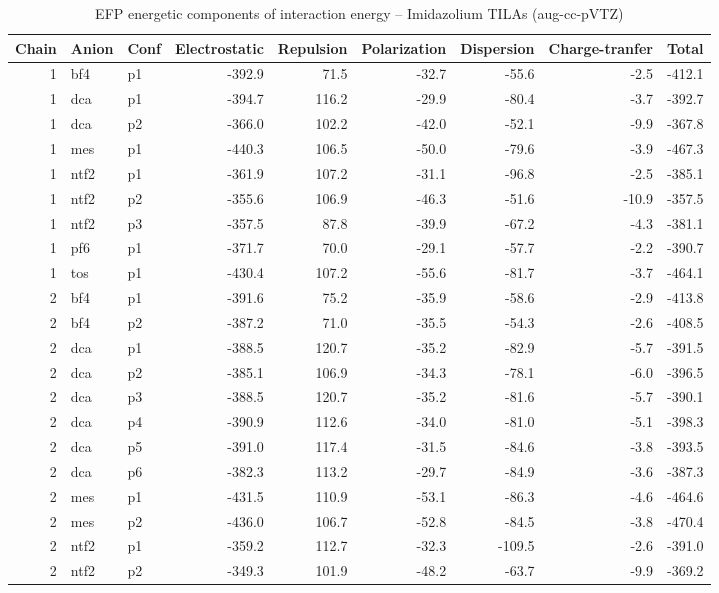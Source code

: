 \documentclass[a4paper]{article}
\begin{document}
\begin{table}[ht]
\centering
\footnotesize
\caption{EFP energetic components of interaction energy -- Imidazolium TILAs (aug-cc-pVTZ)}
\begin{tabular}{rllrrrrrr}
  \hline
Chain & Anion & Conf & Electrostatic & Repulsion & Polarization & Dispersion & Charge-tranfer & Total \\ 
  \hline
 1 & bf4 & p1 & -392.9 & 71.5 & -32.7 & -55.6 & -2.5 & -412.1 \\ 
   1 & dca & p1 & -394.7 & 116.2 & -29.9 & -80.4 & -3.7 & -392.7 \\ 
   1 & dca & p2 & -366.0 & 102.2 & -42.0 & -52.1 & -9.9 & -367.8 \\ 
   1 & mes & p1 & -440.3 & 106.5 & -50.0 & -79.6 & -3.9 & -467.3 \\ 
   1 & ntf2 & p1 & -361.9 & 107.2 & -31.1 & -96.8 & -2.5 & -385.1 \\ 
   1 & ntf2 & p2 & -355.6 & 106.9 & -46.3 & -51.6 & -10.9 & -357.5 \\ 
   1 & ntf2 & p3 & -357.5 & 87.8 & -39.9 & -67.2 & -4.3 & -381.1 \\ 
   1 & pf6 & p1 & -371.7 & 70.0 & -29.1 & -57.7 & -2.2 & -390.7 \\ 
   1 & tos & p1 & -430.4 & 107.2 & -55.6 & -81.7 & -3.7 & -464.1 \\ 
   2 & bf4 & p1 & -391.6 & 75.2 & -35.9 & -58.6 & -2.9 & -413.8 \\ 
   2 & bf4 & p2 & -387.2 & 71.0 & -35.5 & -54.3 & -2.6 & -408.5 \\ 
   2 & dca & p1 & -388.5 & 120.7 & -35.2 & -82.9 & -5.7 & -391.5 \\ 
   2 & dca & p2 & -385.1 & 106.9 & -34.3 & -78.1 & -6.0 & -396.5 \\ 
   2 & dca & p3 & -388.5 & 120.7 & -35.2 & -81.6 & -5.7 & -390.1 \\ 
   2 & dca & p4 & -390.9 & 112.6 & -34.0 & -81.0 & -5.1 & -398.3 \\ 
   2 & dca & p5 & -391.0 & 117.4 & -31.5 & -84.6 & -3.8 & -393.5 \\ 
   2 & dca & p6 & -382.3 & 113.2 & -29.7 & -84.9 & -3.6 & -387.3 \\ 
   2 & mes & p1 & -431.5 & 110.9 & -53.1 & -86.3 & -4.6 & -464.6 \\ 
   2 & mes & p2 & -436.0 & 106.7 & -52.8 & -84.5 & -3.8 & -470.4 \\ 
   2 & ntf2 & p1 & -359.2 & 112.7 & -32.3 & -109.5 & -2.6 & -391.0 \\ 
   2 & ntf2 & p2 & -349.3 & 101.9 & -48.2 & -63.7 & -9.9 & -369.2 \\ 

\end{tabular}
\end{table}
\end{document}
